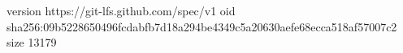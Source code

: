 version https://git-lfs.github.com/spec/v1
oid sha256:09b5228650496fcdabfb7d18a294be4349c5a20630aefe68ecca518af57007c2
size 13179
